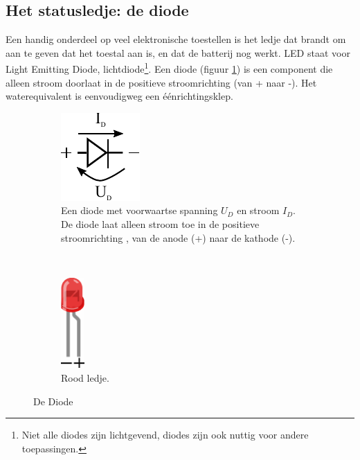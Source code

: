 \documentclass{article}
\begin{document}
		\subsection{Het statusledje: de diode}

			Een handig onderdeel op veel elektronische toestellen is het ledje dat brandt om aan te geven dat het toestal aan is, en dat de batterij nog werkt. LED staat voor Light Emitting Diode, lichtdiode\footnote{Niet alle diodes zijn lichtgevend, diodes zijn ook nuttig voor andere toepassingen.}. Een diode (figuur \ref{fig:diode}) is een component die alleen stroom doorlaat in de positieve stroomrichting (van + naar -). Het waterequivalent is eenvoudigweg een \'e\'enrichtingsklep.
			\begin{figure}[htbp]
			\centering
				\begin{subfigure}[b]{0.45\linewidth}
					\centering
					\includegraphics{diode}
					\caption{Een diode met voorwaartse spanning $U_D$ en stroom $I_D$. De diode laat alleen stroom toe in de  positieve stroomrichting , van de anode (+) naar de kathode (-).}
					\label{fig:diode}
				\end{subfigure}
				~
				\begin{subfigure}[b]{0.45\linewidth}
					\centering
				\includegraphics[width=0.1\textwidth]{led}
				\caption{Rood ledje.}
				\label{fig:led}
				\end{subfigure}
				\caption{De Diode}
			\end{figure}
\end{document}
